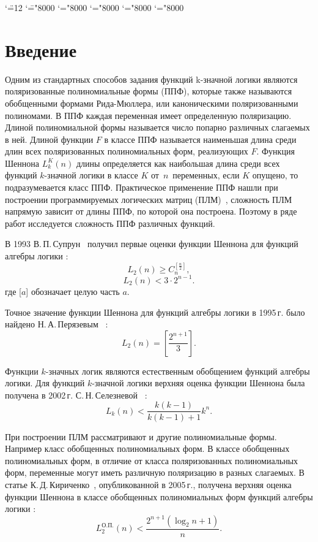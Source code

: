 \documentclass[a4paper, 12pt]{article}
\begin{document}
\begingroup \catcode`\"=12
\gdef\newmcodes@{\mathcode`\'39\mathcode`\*42\mathcode`\."613A%
\mathcode`\-"8000\mathcode`\/47\mathcode`\:"603A\relax}%
\endgroup
\mathcode`\=="8000 \mathcode`\+="8000 \mathcode`\-="8000
\mathcode`\<="8000 \mathcode`\>="8000



\setcounter{secnumdepth}{-1}

\section{Введение}
Одним из стандартных способов задания функций k\nobreakdash-значной логики являются поляризованные полиномиальные формы (ППФ),
которые также называются обобщенными формами Рида-Мюллера, или каноническими поляризованными полиномами. В ППФ каждая переменная
имеет определенную поляризацию. Длиной полиномиальной формы называется число попарно различных слагаемых в ней. Длиной функции
$F$ в классе ППФ называется наименьшая длина среди длин всех поляризованных полиномиальных форм, реализующих $F$.
Функция Шеннона $L^K_k(n)$ длины определяется как наибольшая длина среди всех функций $k$\nobreakdash-значной логики в классе $K$
от~$n$~переменных, если $K$ опущено, то подразумевается класс ППФ.
Практическое применение ППФ нашли при построении программируемых логических матриц (ПЛМ)~\cite{ue04, sb90}, сложность ПЛМ
напрямую зависит от длины ППФ, по которой она построена. Поэтому в ряде работ исследуется сложность ППФ различных функций.

В 1993  В.\,П.\,Супрун~\cite{sv93} получил первые оценки функции Шеннона для функций алгебры логики :
$$
L_2(n) \geqslant C_n^{[\frac{n}{2}]},
$$
$$
L_2(n) < 3 \cdot 2^{n-1}.
$$
где [$a$] обозначает целую часть $a$.

Точное значение функции Шеннона для функций алгебры логики в 1995\,г. было
найдено Н.\,А.\,Перязевым~\cite{pn95} :
$$
L_2(n) = \left[\frac{2^{n+1}}{3}\right].
$$

Функции $k$\nobreakdash-значных логик являются естественным обобщением функций алгебры логики.
Для функций $k$\nobreakdash-значной логики верхняя оценка функции Шеннона была получена в 2002\,г. С.\,Н.\,Селезневой~\cite{ss02} :
$$
L_k(n) < \frac{k(k-1)}{k(k-1)+1}k^n.
$$

При построении ПЛМ рассматривают и другие полиномиальные формы. Например класс обобщенных полиномиальных форм.
В классе обобщенных полиномиальных форм, в отличие от класса поляризованных полиномиальных форм, переменные могут иметь
различную поляризацию в разных слагаемых. В статье К.\,Д.\,Кириченко~\cite{kk05}, опубликованной в 2005\,г., получена верхняя оценка
функции Шеннона в классе обобщенных полиномиальных форм функций алгебры логики :
$$
L^{\text{О.П.}}_2(n) < \frac{2 ^ {n + 1}(\log_2n+1)}{n}.
$$
\end{document}
